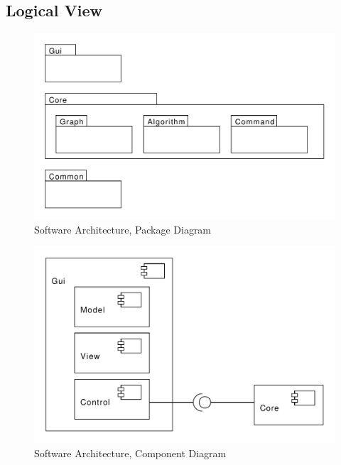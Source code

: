\subsection{Logical View}
\begin{figure}[H]
    \centering
    \includegraphics[scale=0.5]{diagrams/package-diagram.pdf}
    \caption{Software Architecture, Package Diagram}
    \label{fig:package-diagram}
\end{figure}
\begin{figure}[H]
    \centering
    \includegraphics[scale=0.5]{diagrams/component-diagram.pdf}
    \caption{Software Architecture, Component Diagram}
    \label{fig:component-diagram}
\end{figure}
